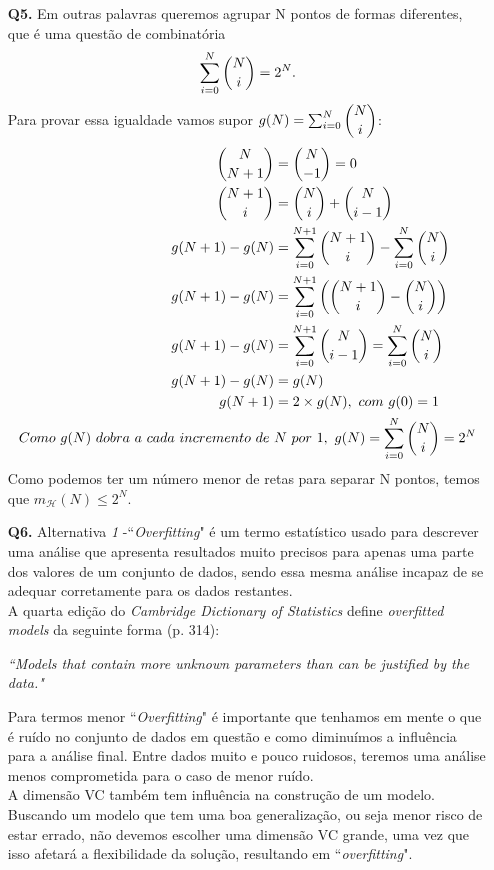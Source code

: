 \documentclass[12pt]{article}
\begin{document}
\begin{enumerate}
\item [\textbf{Q5.}] Em outras palavras queremos agrupar N pontos de formas diferentes, que é uma questão de combinatória \[\sum_{i=0}^{N}\dbinom{N}{i} = 2^N.\]
Para provar essa igualdade vamos supor $g(N) = \sum_{i=0}^{N}\dbinom{N}{i}$:
	\begin{align}
		\dbinom{N}{N+1} &= \dbinom{N}{-1} = 0\\
		\dbinom{N+1}{i} &= \dbinom{N}{i} + \dbinom{N}{i-1}\\
		g(N + 1) - g(N) &= \sum_{i=0}^{N+1}\dbinom{N+1}{i} - \sum_{i=0}^{N}\dbinom{N}{i}\\
		g(N + 1) - g(N) &= \sum_{i=0}^{N+1} \left( \dbinom{N+1}{i} - \dbinom{N}{i} \right)\\
		g(N + 1) - g(N) &= \sum_{i=0}^{N+1} \dbinom{N}{i-1} = \sum_{i=0}^{N}\dbinom{N}{i}\\
		g(N + 1) - g(N) &= g(N)\\
		g(N + 1) &= 2 \times g(N),\ com\ g(0) = 1\\
		Como\ g(N)\ dobra\ a\ cada\ incremento\ de\ &N\ por\ 1,\ g(N) = \sum_{i=0}^{N}\dbinom{N}{i} = 2^N
	\end{align}
	Como podemos ter um número menor de retas para separar N pontos, temos que $m_{\mathcal{H}}(N) \leq 2^N$.

\item [\textbf{Q6.}] Alternativa \textit{1} -``\textit{Overfitting}" é um termo estatístico usado para descrever uma análise que apresenta resultados muito precisos para apenas uma parte dos valores de um conjunto de dados, sendo essa mesma análise incapaz de se adequar corretamente para os dados restantes.\\
A quarta edição do \textit{Cambridge Dictionary of Statistics} define \textit{overfitted models} da seguinte forma (p. 314):
	\begin{addmargin}[1em]{2em}%
		\textit{``Models that contain more unknown parameters than can be justified by the data."}
	\end{addmargin}
Para termos menor ``\textit{Overfitting}" é importante que tenhamos em mente o que é ruído no conjunto de dados em questão e como diminuímos a influência para a análise final. Entre dados muito e pouco ruidosos, teremos uma análise menos comprometida para o caso de menor ruído.\\
A dimensão VC também tem influência na construção de um modelo. Buscando um modelo que tem uma boa generalização, ou seja menor risco de estar errado, não devemos escolher uma dimensão VC grande, uma vez que isso afetará a flexibilidade da solução, resultando em ``\textit{overfitting}".


\end{enumerate}
\end{document}
